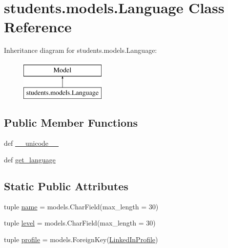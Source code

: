 \hypertarget{classstudents_1_1models_1_1_language}{\section{students.\-models.\-Language Class Reference}
\label{classstudents_1_1models_1_1_language}
}
Inheritance diagram for students.\-models.\-Language\-:\begin{figure}[H]
\begin{center}
\leavevmode
\includegraphics[height=2.000000cm]{classstudents_1_1models_1_1_language}
\end{center}
\end{figure}
\subsection*{Public Member Functions}
\begin{DoxyCompactItemize}
\item 
def \hyperlink{classstudents_1_1models_1_1_language_a656e053c3a3adce525fb3a3b000d08b1}{\-\_\-\-\_\-unicode\-\_\-\-\_\-}
\item 
def \hyperlink{classstudents_1_1models_1_1_language_a5b15a386a956f22ce3507f94f57cbf60}{get\-\_\-language}
\end{DoxyCompactItemize}
\subsection*{Static Public Attributes}
\begin{DoxyCompactItemize}
\item 
tuple \hyperlink{classstudents_1_1models_1_1_language_ac37164d4a1b3ac7c31546adfe1dd18d5}{name} = models.\-Char\-Field(max\-\_\-length = 30)
\item 
tuple \hyperlink{classstudents_1_1models_1_1_language_affd66c68817bac13ece99da9eca10101}{level} = models.\-Char\-Field(max\-\_\-length = 30)
\item 
tuple \hyperlink{classstudents_1_1models_1_1_language_ab9c9571762a4e0df5dda38d8ad451c3d}{profile} = models.\-Foreign\-Key(\hyperlink{classstudents_1_1models_1_1_linked_in_profile}{Linked\-In\-Profile})
\end{DoxyCompactItemize}


